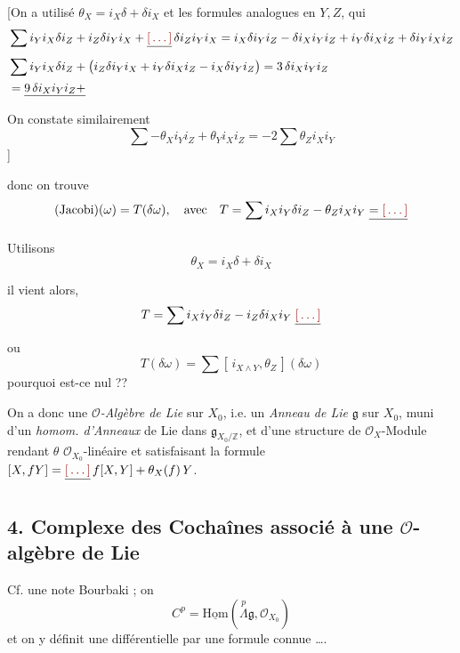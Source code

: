 \documentclass[11pt,a4paper]{article}
\begin{document}
[On a utilisé $\boxed{\theta_X = i_X \delta + \delta i_X}$ et les formules
analogues en $Y, Z$, qui 
\begin{align*}
&\sum i_Y i_X \delta i_Z + i_Z \delta i_Y i_X + \struck{\ill{}}\, \delta i_Z i_Y i_X
= i_X \delta i_Y i_Z - \delta i_X i_Y i_Z + i_Y \delta i_X i_Z + \delta i_Y i_X i_Z \\
&\sum i_Y i_X \delta i_Z + \big( i_Z \delta i_Y i_X + i_Y \delta i_X i_Z - i_X \delta i_Y i_Z \big)
= 3\, \delta i_X i_Y i_Z \\
&= \struck{9\, \delta i_X i_Y i_Z +}
\end{align*}
On constate similairement
\[
\sum -\theta_X i_Y i_Z + \theta_Y i_X i_Z = -2 \sum \theta_Z i_X i_Y
\]
]

donc on trouve
\[
(\text{Jacobi})(\omega) = T(\delta\omega), \quad \text{avec} \quad
T = \sum i_X i_Y \delta i_Z - \theta_Z i_X i_Y \;\struck{= \ill{}}
\]

Utilisons
\[
\boxed{\theta_X = i_X \delta + \delta i_X}
\]

il vient alors, 
\[
T = \sum i_X i_Y \delta i_Z - i_Z \delta i_X i_Y \;\struck{\ill{}}
\]
ou
\[
T(\delta\omega) = \sum [\, i_{X \wedge Y}, \theta_Z \,](\delta\omega)
\]
pourquoi est-ce nul ??

On a donc une \emph{$\mathcal{O}$-Algèbre de Lie} sur $X_0$, i.e. un
\emph{Anneau de Lie}  $\mathfrak{g}$ sur 
$X_0$, muni d'un \emph{homom. d'Anneaux} de Lie
 dans $\mathfrak{g}_{X_0/\mathbb{Z}}$, et
d'une structure de $\mathcal{O}_X$-Module rendant $\theta$
$\mathcal{O}_{X_0}$-linéaire et satisfaisant la formule
$[X, fY] = \struck{\ill{}}\, f[X,Y] + \theta_X(f)\,Y$.

\subsection*{4. Complexe des Cochaînes associé à une $\mathcal{O}$-algèbre de Lie }

Cf. une note Bourbaki ; on  
\[
C^p = \underline{\mathrm{Hom}}(\overset{p}{\Lambda}\mathfrak{g}, \mathcal{O}_{X_0})
\]
et on y définit une différentielle par une formule connue ….
\end{document}
